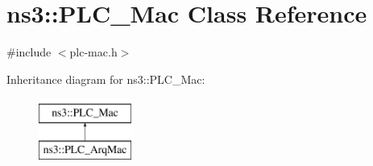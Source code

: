 \hypertarget{classns3_1_1PLC__Mac}{\section{ns3\-:\-:\-P\-L\-C\-\_\-\-Mac \-Class \-Reference}
\label{classns3_1_1PLC__Mac}
}


{\ttfamily \#include $<$plc-\/mac.\-h$>$}

\-Inheritance diagram for ns3\-:\-:\-P\-L\-C\-\_\-\-Mac\-:\begin{figure}[H]
\begin{center}
\leavevmode
\includegraphics[height=2.000000cm]{classns3_1_1PLC__Mac}
\end{center}
\end{figure}
